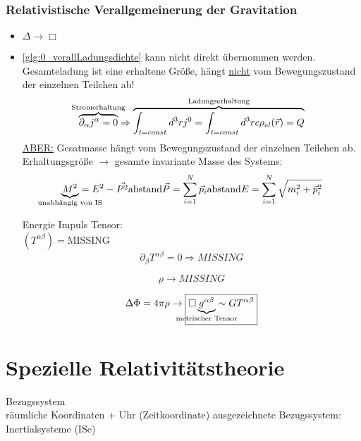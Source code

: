 \documentclass[a4paper, 11pt]{article}
\numberwithin{equation}{section}
\begin{document}
\subsubsection*{Relativistische Verallgemeinerung der Gravitation}
\renewcommand{\labelitemi}{$\bullet$}
\begin{itemize}
\item $\Delta \rightarrow \Box$

\item \ref{glg:0_verallLadungsdichte} kann nicht direkt übernommen werden.\\
Gesamteladung ist eine erhaltene Größe, hängt \underline{nicht} vom Bewegungszustand der einzelnen Teilchen ab!
\begin{equation}
\overbrace{\partial_\alpha j^\alpha = 0}^{\mathclap{\text{Stromerhaltung}}} \Rightarrow \overbrace{\int_{t=const}d^3rj^0 = \int_{t=const}d^3rc \rho_{el}(\vec{r}) = Q}^{\text{Ladungserhaltung}}
\end{equation}
\underline{ABER:} Gesatmasse hängt vom Bewegungszustand der einzelnen Teilchen ab.\\
Erhaltungsgröße $\rightarrow$ gesamte invariante Masse des Systems:
\begin{equation}
\underbrace{M^2}_{\mathclap{\text{unabhängig von IS}}} = E^2 - \vec{P^2} \text{abstand} \vec{P} = \sum_{i=1}^N \vec{p}_i \text{abstand} E= \sum_{i=1}^N \sqrt{m_i^2+\vec{p}_i^2}
\end{equation}

Energie Impuls Tensor:\\
$(T^{\alpha\beta}) =  $MISSING
\begin{equation}
\partial_\beta T^{\alpha\beta} = 0 \Rightarrow MISSING
\end{equation}


\begin{equation}
\rho \rightarrow MISSING
\end{equation}


\begin{equation}
\Delta \Phi = 4 \pi \rho \rightarrow \boxed{\Box \underbrace{g^{\alpha \beta}}_{\mathclap{\text{metrischer Tensor}}} \sim G T^{\alpha\beta}   }
\end{equation}
\end{itemize}




\newpage
\section{Spezielle Relativitätstheorie}
Bezugssystem\\
räumliche Koordinaten + Uhr (Zeitkoordinate)
ausgezeichnete Bezugssystem: Inertialsysteme (ISe)
\end{document}

